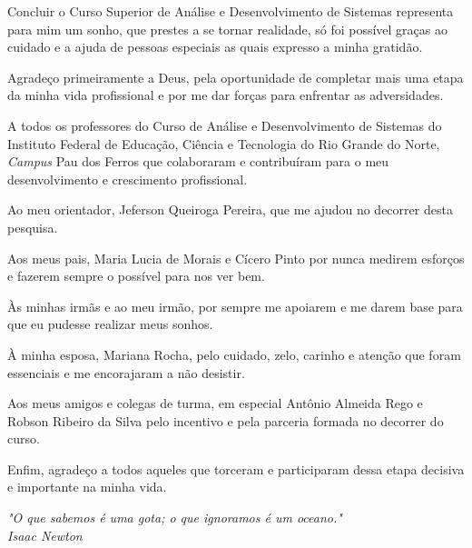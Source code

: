 \documentclass[
12pt,			     	%
a4paper,                %
oneside,                %
brazil		          	%
]{configuracoes}		%
\begin{document}
	
\begin{agradecimentos}
Concluir o Curso Superior de Análise e Desenvolvimento de Sistemas representa para mim um sonho, que prestes a se tornar realidade, só foi possível graças ao cuidado e a ajuda de pessoas especiais as quais expresso a minha gratidão. 
	
Agradeço primeiramente a Deus, pela oportunidade de completar mais uma etapa da minha vida profissional e por me dar forças para enfrentar as adversidades.

A todos os professores do Curso de Análise e Desenvolvimento de Sistemas do Instituto Federal de Educação, Ciência e Tecnologia do Rio Grande do Norte, \textit{Campus} Pau dos Ferros que colaboraram e contribuíram para o meu desenvolvimento e crescimento profissional.

Ao meu orientador, Jeferson Queiroga Pereira, que me ajudou no decorrer desta pesquisa. 

Aos meus pais, Maria Lucia de Morais e Cícero Pinto por nunca medirem esforços e fazerem sempre o possível para nos ver bem.

Às minhas irmãs e ao meu irmão, por sempre me apoiarem e me darem base para que eu pudesse realizar meus sonhos.

À minha esposa, Mariana Rocha, pelo cuidado, zelo, carinho e atenção que foram essenciais e me encorajaram a não desistir.

Aos meus amigos e colegas de turma, em especial Antônio Almeida Rego e Robson Ribeiro da Silva pelo incentivo e pela parceria formada no decorrer do curso.

Enfim, agradeço a todos aqueles que torceram e participaram dessa etapa decisiva e importante na minha vida.

\end{agradecimentos}

\begin{epigrafe}
	\vspace*{\fill}
	\begin{flushright}
		\textit{"O que sabemos é uma gota; o que ignoramos é um oceano."\\Isaac Newton}
	\end{flushright}
\end{epigrafe}
\pagebreak
\end{document}
